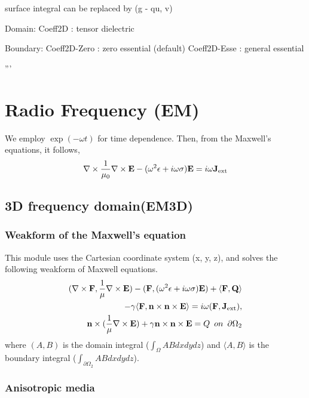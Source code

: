 \documentclass[11pt,a4paper,final]{report}
\begin{document}
    surface integral can be replaced by (g - qu, v)
        
  Domain:   
     Coeff2D          : tensor dielectric

  Boundary:
     Coeff2D-Zero     : zero essential (default)
     Coeff2D-Esse     : general essential

'''
\section{Radio Frequency (EM)}

We employ $\exp{(-\omega t)}$ for time dependence. Then, from the Maxwell's equations, it follows,
\begin{equation}
\nabla \times \frac{1}{\mu_0} \nabla \times \mathbf{E} - (\omega^2 \epsilon + i \omega \sigma) \mathbf{E} = i \omega \mathbf{J}_{\rm ext}
\end{equation}

\subsection{3D frequency domain(EM3D)}
\subsubsection{Weakform of the Maxwell's equation}
This module uses the Cartesian coordinate system (x, y, z), and solves the following weakform of Maxwell equations. 
 \begin{align}
(\nabla \times \mathbf{F},  \frac{1}{\mu}\nabla  \times  \mathbf{E})
 - (\mathbf{F},  (\omega^2 \epsilon+ i \omega \sigma)  \mathbf{E}) 
 +  \langle \mathbf{F},  \mathbf{Q} \rangle 
 \notag \\
 - \gamma \langle  \mathbf{F}, \mathbf{n} \times \mathbf{n} \times  \mathbf{E}\rangle = i \omega (\mathbf{F}, \mathbf{J}_{\rm ext} ) ,
\label{em3d_weak} \\
\label{em3d_weakBC} 
 \mathbf{n} \times (\frac{1}{\mu} \nabla \times \mathbf{E}) + \gamma \mathbf{n} \times \mathbf{n} \times  \mathbf{E} = Q\,\,\,on\,\,\,\partial \Omega_{2}
 \end{align}
  where $(A , B)$ is the domain integral ($\int_{\Omega} AB dxdydz$) and $\langle A, B \rangle $ is the boundary integral ($\int_{\partial \Omega_{2}} ABdxdydz$). 
 
 \subsubsection{Anisotropic media}
 
\end{document}
